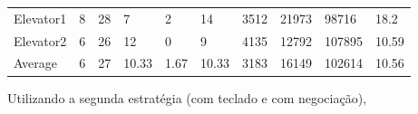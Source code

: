 ﻿\documentclass[a4paper]{article}
\begin{document}
\begin{table}[h]
\begin{tabular}{@{}llllllllll@{}}
Elevator1 & 8        & 28            & 7           & 2                                                               & 14                                                                  & 3512                                                         & 21973                                                 & 98716                                                   & 18.2        \\
Elevator2 & 6        & 26            & 12           & 0                                                               & 9                                                                  & 4135                                                         & 12792                                                 & 107895                                                   & 10.59         \\
Average   & 6     & 27         & 10.33        & 1.67                                                               & 10.33                                                               & 3183                                                         & 16149                                                 & 102614                                                   & 10.56          \\ \bottomrule
\end{tabular}
\end{table}

Utilizando a segunda estratégia (com teclado e com negociação),
\end{document}
